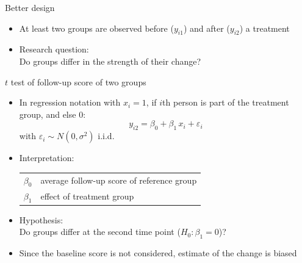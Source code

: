 \documentclass[aspectratio=169]{beamer}
\begin{document}
\begin{frame}{Better design}
\begin{itemize}
    \item At least two groups are observed before ($y_{i1}$) and after
      ($y_{i2}$) a treatment
        \begin{center}
        \end{center}
      \item Research question:\\
      Do groups differ in the strength of their change?
\end{itemize}
\end{frame}

\begin{frame}[<+->]{$t$ test of follow-up score of two groups}
\begin{itemize}
  \item In regression notation with $x_i = 1$, if $i$th person is part of
    the treatment group, and else $0$:
    \[
      y_{i2} = \beta_0 + \beta_1 \, x_i + \varepsilon_i
    \]
    with $\varepsilon_i \sim N(0, \sigma^2)$ i.i.d.
  \item Interpretation:
    \begin{center}
    \begin{tabular}{ll}
    $\beta_0$ & average follow-up score of reference group\\
    $\beta_1$ & effect of treatment group
    \end{tabular}
    \end{center}
  \item Hypothesis:\\
        Do groups differ at the second time point ($H_0\colon \beta_1 = 0$)?
  \item Since the baseline score is not considered, estimate of the change
    is biased
\end{itemize}
\end{frame}
\end{document}
